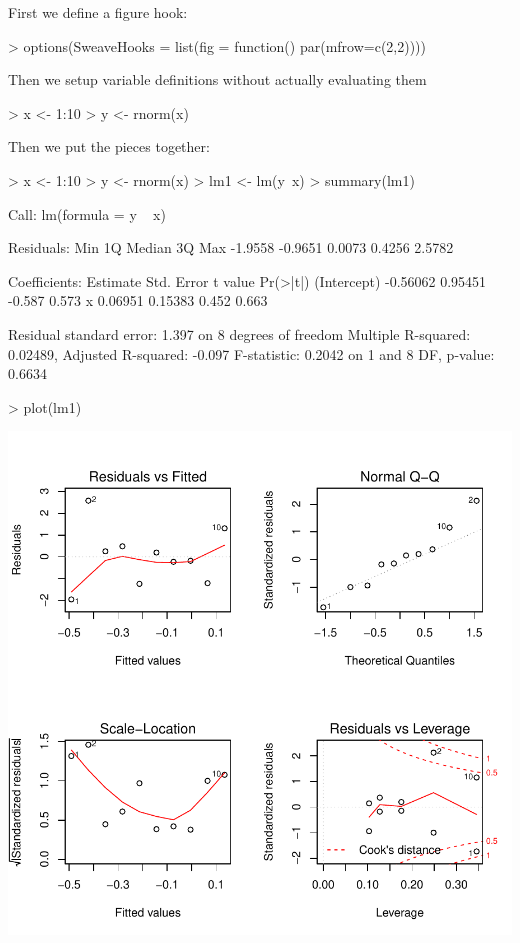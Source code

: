 \documentclass[a4paper]{article}
\begin{document}
First we define a figure hook:
\begin{Schunk}
\begin{Sinput}
> options(SweaveHooks = list(fig = function() par(mfrow=c(2,2))))
\end{Sinput}
\end{Schunk}

Then we setup variable definitions without actually evaluating them
\begin{Schunk}
\begin{Sinput}
> x <- 1:10
> y <- rnorm(x)
\end{Sinput}
\end{Schunk}


Then we put the pieces together:
\begin{center}
\begin{Schunk}
\begin{Sinput}
> x <- 1:10
> y <- rnorm(x)
> lm1 <- lm(y~x)
> summary(lm1)
\end{Sinput}
\begin{Soutput}
Call:
lm(formula = y ~ x)

Residuals:
    Min      1Q  Median      3Q     Max 
-1.9558 -0.9651  0.0073  0.4256  2.5782 

Coefficients:
            Estimate Std. Error t value Pr(>|t|)
(Intercept) -0.56062    0.95451  -0.587    0.573
x            0.06951    0.15383   0.452    0.663

Residual standard error: 1.397 on 8 degrees of freedom
Multiple R-squared: 0.02489,	Adjusted R-squared: -0.097 
F-statistic: 0.2042 on 1 and 8 DF,  p-value: 0.6634 
\end{Soutput}
\begin{Sinput}
> plot(lm1)
\end{Sinput}
\end{Schunk}
\includegraphics{test-003}
\end{center}
\end{document}
